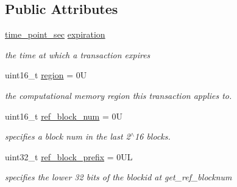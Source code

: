 \subsection*{Public Attributes}
\begin{DoxyCompactItemize}
\item 
\mbox{\label{structaacio_1_1chain_1_1transaction__header_a1ee2d91d122ac813b7a0c7cb26822bfa}} 
\mbox{\hyperlink{classfc_1_1time__point__sec}{time\+\_\+point\+\_\+sec}} \mbox{\hyperlink{structaacio_1_1chain_1_1transaction__header_a1ee2d91d122ac813b7a0c7cb26822bfa}{expiration}}
\begin{DoxyCompactList}\small\item\em the time at which a transaction expires \end{DoxyCompactList}\item 
\mbox{\label{structaacio_1_1chain_1_1transaction__header_a8182330764064d0c5e66d62e0020054b}} 
uint16\+\_\+t \mbox{\hyperlink{structaacio_1_1chain_1_1transaction__header_a8182330764064d0c5e66d62e0020054b}{region}} = 0U
\begin{DoxyCompactList}\small\item\em the computational memory region this transaction applies to. \end{DoxyCompactList}\item 
\mbox{\label{structaacio_1_1chain_1_1transaction__header_ac8e1a2301ce4e1a38b71e98e257a70c8}} 
uint16\+\_\+t \mbox{\hyperlink{structaacio_1_1chain_1_1transaction__header_ac8e1a2301ce4e1a38b71e98e257a70c8}{ref\+\_\+block\+\_\+num}} = 0U
\begin{DoxyCompactList}\small\item\em specifies a block num in the last 2$^\wedge$16 blocks. \end{DoxyCompactList}\item 
\mbox{\label{structaacio_1_1chain_1_1transaction__header_a737d89abaf2c0a6052d25cdee23573ef}} 
uint32\+\_\+t \mbox{\hyperlink{structaacio_1_1chain_1_1transaction__header_a737d89abaf2c0a6052d25cdee23573ef}{ref\+\_\+block\+\_\+prefix}} = 0\+UL
\begin{DoxyCompactList}\small\item\em specifies the lower 32 bits of the blockid at get\+\_\+ref\+\_\+blocknum \end{DoxyCompactList}\item 

\end{DoxyCompactItemize}
